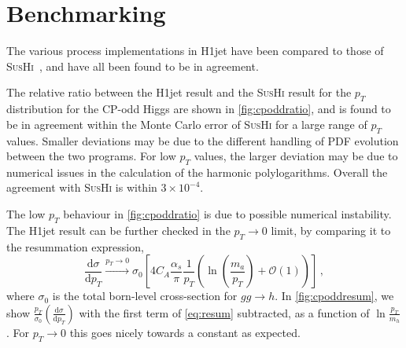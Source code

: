 \documentclass[12pt,a4wide]{article}
\begin{document}
\newpage 

\section{Benchmarking} \label{sec:benchmarking}
The various process implementations in H1jet have been compared to those of \textsc{SusHi}~\cite{Harlander:2012pb,Harlander:2016hcx}, and have all been found to be in agreement. 

The relative ratio between the H1jet result and the \textsc{SusHi} result for the $p_T$ distribution for the CP-odd Higgs are shown in \autoref{fig:cpoddratio}, and is found to be in agreement within the Monte Carlo error of \textsc{SusHi} for a large range of $p_T$ values. Smaller deviations may be due to the different handling of PDF evolution between the two programs. For low $p_T$ values, the larger deviation may be due to numerical issues in the calculation of the harmonic polylogarithms. Overall the agreement with \textsc{SusHi} is within $3 \times 10^{-4}$. 

The low $p_T$ behaviour in \autoref{fig:cpoddratio} is due to possible numerical instability. The H1jet result can be further checked in the $p_{T} \rightarrow 0$ limit, by comparing it to the resummation expression, 
\begin{equation}
	\frac{\mathrm{d} \sigma}{\mathrm{d} p_T} \xrightarrow{p_T \rightarrow 0} \sigma_0 \left [ 4 C_A \frac{\alpha_s}{\pi} \frac{1}{p_T} \left(\ln\left ( \frac{m_a}{p_T} \right ) + \mathcal{O} (1)\right) \right ] \,, \label{eq:resum}
\end{equation}
where $\sigma_0$ is the total born-level cross-section for $gg \rightarrow h$. In \autoref{fig:cpoddresum}, we show $\frac{p_T}{\sigma_0} \left ( \frac{\mathrm{d} \sigma}{\mathrm{d} p_T} \right )$ with the first term of \autoref{eq:resum} subtracted, as a function of $\ln \frac{p_T}{m_h}$. For $p_T \rightarrow 0$ this goes nicely towards a constant as expected. 

\newpage 
\end{document}
